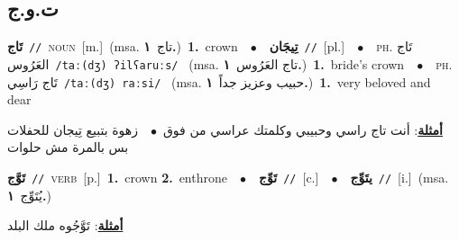 \documentclass[10pt,a4paper,twoside]{article} %
\begin{document}
\begin{multicols}{2}
\vspace{-3mm}
\subsection*{\color{blue}\foreignlanguage{arabic}{ت.و.ج}\color{blue}{}} 

{\setlength\topsep{0pt}\textbf{\foreignlanguage{arabic}{تَاج}}\ {\color{gray}\texttt{//}\color{black}}\ \textsc{noun}\ [m.]\ \color{gray}(msa. \foreignlanguage{arabic}{تاج}~\foreignlanguage{arabic}{\textbf{١.}})\color{black}\ \textbf{1.}~crown\ \ $\bullet$\ \ \setlength\topsep{0pt}\textbf{\foreignlanguage{arabic}{تِيجَان}}\ {\color{gray}\texttt{//}\color{black}}\ [pl.]\ \ $\bullet$\ \ \textsc{ph.} \color{gray} \foreignlanguage{arabic}{تَاج العَرُوس}\color{black}\ {\color{gray}\texttt{/{\sffamily taː(dʒ) ʔilʕaruːs}/}\color{black}}\ \color{gray} (msa. \foreignlanguage{arabic}{تاج العَرُوس}~\foreignlanguage{arabic}{\textbf{١.}})\color{black}\ \textbf{1.}~bride's crown\ \ $\bullet$\ \ \textsc{ph.} \color{gray} \foreignlanguage{arabic}{تَاج رَاسِي}\color{black}\ {\color{gray}\texttt{/{\sffamily taː(dʒ) raːsi}/}\color{black}}\ \color{gray} (msa. \foreignlanguage{arabic}{حبيب وعزيز جداً}~\foreignlanguage{arabic}{\textbf{١.}})\color{black}\ \textbf{1.}~very beloved and dear\  \begin{flushright}\color{gray}\foreignlanguage{arabic}{\textbf{\underline{\foreignlanguage{arabic}{أمثلة}}}: أنت تاج راسي وحبيبي وكلمتك عراسي من فوق\ $\bullet$\ \  زهوة بتبيع تِيجان للحفلات بس بالمرة مش حلوات}\end{flushright}\color{black}} \vspace{2mm}

{\setlength\topsep{0pt}\textbf{\foreignlanguage{arabic}{تَوَّج}}\ {\color{gray}\texttt{//}\color{black}}\ \textsc{verb}\ [p.]\ \textbf{1.}~crown  \textbf{2.}~enthrone\ \ $\bullet$\ \ \setlength\topsep{0pt}\textbf{\foreignlanguage{arabic}{تَوِّج}}\ {\color{gray}\texttt{//}\color{black}}\ [c.]\ \ $\bullet$\ \ \setlength\topsep{0pt}\textbf{\foreignlanguage{arabic}{يتَوِّج}}\ {\color{gray}\texttt{//}\color{black}}\ [i.]\ \color{gray}(msa. \foreignlanguage{arabic}{يُتَوِّج}~\foreignlanguage{arabic}{\textbf{١.}})\color{black}\  \begin{flushright}\color{gray}\foreignlanguage{arabic}{\textbf{\underline{\foreignlanguage{arabic}{أمثلة}}}: تَوَّجُوه ملك البلد}\end{flushright}\color{black}} \vspace{2mm}


\end{multicols}
\end{document}
